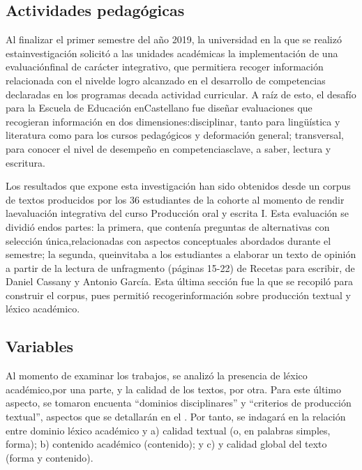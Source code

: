 \documentclass{textolivre}
\begin{document}
\subsection{Actividades pedagógicas}\label{sec-actividades}
Al finalizar el primer semestre del año 2019, la universidad en la que se
realizó estainvestigación solicitó a las unidades académicas la implementación
de una evaluaciónfinal de carácter integrativo, que permitiera recoger
información relacionada con el nivelde logro alcanzado en el desarrollo de
competencias declaradas en los programas decada actividad curricular. A raíz de
esto, el desafío para la Escuela de Educación enCastellano fue diseñar
evaluaciones que recogieran información en dos dimensiones:disciplinar, tanto
para lingüística y literatura como para los cursos pedagógicos y deformación
general; transversal, para conocer el nivel de desempeño en competenciasclave,
a saber, lectura y escritura.

Los resultados que expone esta investigación han sido obtenidos desde un corpus
de textos producidos por los 36 estudiantes de la cohorte al momento de rendir
laevaluación integrativa del curso Producción oral y escrita I. Esta evaluación
se dividió endos partes: la primera, que contenía preguntas de alternativas con
selección única,relacionadas con aspectos conceptuales abordados durante el
semestre; la segunda, queinvitaba a los estudiantes a elaborar un texto de
opinión a partir de la lectura de unfragmento (páginas 15-22) de Recetas para
escribir, de Daniel Cassany y Antonio García. Esta última sección fue la que se
recopiló para construir el corpus, pues permitió recogerinformación sobre
producción textual y léxico académico.


\subsection{Variables}\label{sec-variables}
Al momento de examinar los trabajos, se analizó la presencia de léxico
académico,por una parte, y la calidad de los textos, por otra. Para este último
aspecto, se tomaron encuenta “dominios disciplinares” y “criterios de
producción textual”, aspectos que se detallarán en el . Por tanto,
se indagará en la relación entre dominio léxico académico y a) calidad textual
(o, en palabras simples, forma); b) contenido académico (contenido); y c) y
calidad global del texto (forma y contenido).
\end{document}
